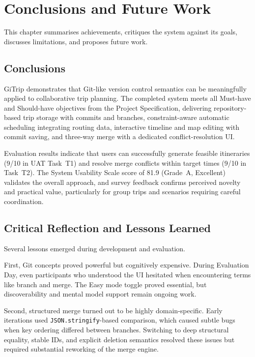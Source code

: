 \chapter{Conclusions and Future Work}
\label{ch:conclusions}

This chapter summarises achievements, critiques the system against its goals,
discusses limitations, and proposes future work.

\section{Conclusions}
GiTrip demonstrates that Git-like version control semantics can be meaningfully
applied to collaborative trip planning. The completed system meets all Must-have
and Should-have objectives from the Project Specification, delivering
repository-based trip storage with commits and branches, constraint-aware
automatic scheduling integrating routing data, interactive timeline and map
editing with commit saving, and three-way merge with a dedicated
conflict-resolution UI.

Evaluation results indicate that users can successfully generate feasible
itineraries (9/10 in UAT Task~T1) and resolve merge conflicts within target
times (9/10 in Task~T2). The System Usability Scale score of 81.9 (Grade~A,
Excellent) validates the overall approach, and survey feedback confirms perceived
novelty and practical value, particularly for group trips and scenarios requiring
careful coordination.

\section{Critical Reflection and Lessons Learned}
Several lessons emerged during development and evaluation.

First, Git concepts proved powerful but cognitively expensive. During Evaluation
Day, even participants who understood the UI hesitated when encountering terms
like branch and merge. The Easy mode toggle proved essential, but
discoverability and mental model support remain ongoing work.

Second, structured merge turned out to be highly domain-specific. Early
iterations used \texttt{JSON.stringify}-based comparison, which caused subtle
bugs when key ordering differed between branches. Switching to deep structural
equality, stable IDs, and explicit deletion semantics resolved these issues but
required substantial reworking of the merge engine.

